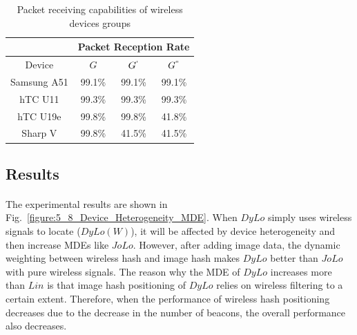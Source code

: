 \documentclass[a4paper,12pt]{report}
\begin{document}
\begin{table}
    \begin{center}
    \caption{Packet receiving capabilities of wireless devices groups}
    \label{table:5_8_Packet_Receiving_Capabilities}
        \begin{tabular}{|c|c|c|c|}
            \hline
                & \multicolumn{3}{|c|}{Packet Reception Rate} \\
            \hline
                Device & $G$ & $G^`$ & $G^{``}$\\
            \hline
                Samsung A51 & 99.1\% & 99.1\% & 99.1\%\\
            \hline
                hTC U11     & 99.3\% & 99.3\% & 99.3\%\\
            \hline
                hTC U19e    & 99.8\% & 99.8\% & 41.8\%\\
            \hline
                Sharp V     & 99.8\% & 41.5\% & 41.5\%\\
            \hline
        \end{tabular}
    \end{center}
\end{table}

\subsection{Results}

\paragraph{}
The experimental results are shown in Fig.~\ref{figure:5_8_Device_Heterogeneity_MDE}. When $DyLo$ simply uses wireless signals to locate ($DyLo(W)$), it will be affected by device heterogeneity and then increase MDEs like $JoLo$. However, after adding image data, the dynamic weighting between wireless hash and image hash makes $DyLo$ better than $JoLo$ with pure wireless signals. The reason why the MDE of $DyLo$ increases more than $Lin$ is that image hash positioning of $DyLo$ relies on wireless filtering to a certain extent. Therefore, when the performance of wireless hash positioning decreases due to the decrease in the number of beacons, the overall performance also decreases.
%
\end{document}
